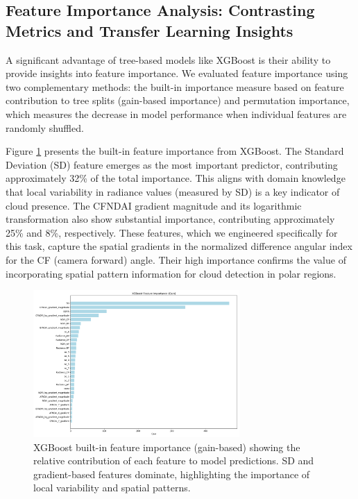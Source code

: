 \documentclass[10pt,letterpaper]{article}
\begin{document}
\subsection{Feature Importance Analysis: Contrasting Metrics and Transfer Learning Insights}

A significant advantage of tree-based models like XGBoost is their ability to provide insights into feature importance. We evaluated feature importance using two complementary methods: the built-in importance measure based on feature contribution to tree splits (gain-based importance) and permutation importance, which measures the decrease in model performance when individual features are randomly shuffled.

Figure \ref{fig:builtin_importance} presents the built-in feature importance from XGBoost. The Standard Deviation (SD) feature emerges as the most important predictor, contributing approximately 32\% of the total importance. This aligns with domain knowledge that local variability in radiance values (measured by SD) is a key indicator of cloud presence. The CFNDAI gradient magnitude and its logarithmic transformation also show substantial importance, contributing approximately 25\% and 8\%, respectively. These features, which we engineered specifically for this task, capture the spatial gradients in the normalized difference angular index for the CF (camera forward) angle. Their high importance confirms the value of incorporating spatial pattern information for cloud detection in polar regions.

\begin{figure}[h]
\centering
\includegraphics[width=0.7\textwidth]{xgboost_feature_importance_gain_raw_autoencoder_extra engineered.png}
\caption{XGBoost built-in feature importance (gain-based) showing the relative contribution of each feature to model predictions. SD and gradient-based features dominate, highlighting the importance of local variability and spatial patterns.}
\label{fig:builtin_importance}
\end{figure}
\end{document}
